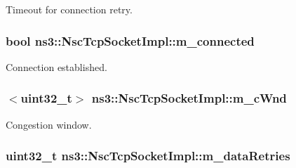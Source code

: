 Timeout for connection retry. 

\subsubsection[{\texorpdfstring{m\+\_\+connected}{m_connected}}]{\setlength{\rightskip}{0pt plus 5cm}bool ns3\+::\+Nsc\+Tcp\+Socket\+Impl\+::m\+\_\+connected\hspace{0.3cm}{\ttfamily [private]}}\hypertarget{classns3_1_1NscTcpSocketImpl_a44d10189d15f158179fb5b8849001244}{}\label{classns3_1_1NscTcpSocketImpl_a44d10189d15f158179fb5b8849001244}


Connection established. 

\subsubsection[{\texorpdfstring{m\+\_\+c\+Wnd}{m_cWnd}}]{$<$uint32\+\_\+t$>$ ns3\+::\+Nsc\+Tcp\+Socket\+Impl\+::m\+\_\+c\+Wnd\hspace{0.3cm}{\ttfamily [private]}}\hypertarget{classns3_1_1NscTcpSocketImpl_a7e61e32de2c6d1e1296c2d78ba513fb2}{}\label{classns3_1_1NscTcpSocketImpl_a7e61e32de2c6d1e1296c2d78ba513fb2}


Congestion window. 

\subsubsection[{\texorpdfstring{m\+\_\+data\+Retries}{m_dataRetries}}]{\setlength{\rightskip}{0pt plus 5cm}uint32\+\_\+t ns3\+::\+Nsc\+Tcp\+Socket\+Impl\+::m\+\_\+data\+Retries\hspace{0.3cm}{\ttfamily [private]}}\hypertarget{classns3_1_1NscTcpSocketImpl_a75843c5fe70b29ae0a5518762872fd6d}{}\label{classns3_1_1NscTcpSocketImpl_a75843c5fe70b29ae0a5518762872fd6d}


